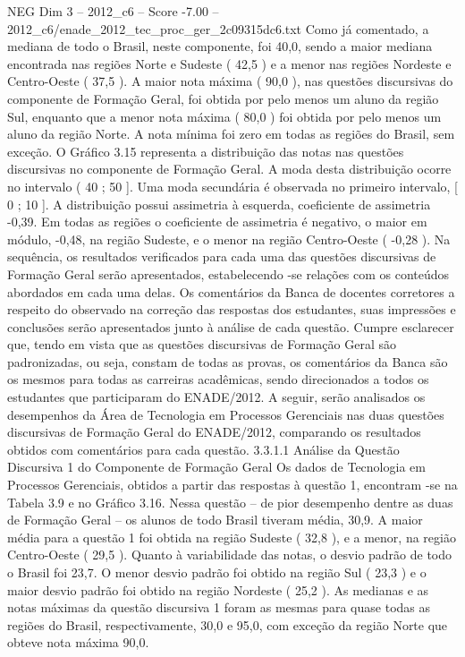 \begin{textsample}{NEG Dim 3 – 2012\_c6 – Score -7.00 – 2012\_c6/enade\_2012\_tec\_proc\_ger\_2c09315dc6.txt}
Como já comentado, a mediana de todo o Brasil, neste componente, foi 40,0, sendo a maior mediana encontrada nas regiões Norte e Sudeste ( 42,5 ) e a menor nas regiões Nordeste e Centro-Oeste ( 37,5 ).
A maior nota máxima ( 90,0 ), nas questões discursivas do componente de Formação Geral, foi obtida por pelo menos um aluno da região Sul, enquanto que a menor nota máxima ( 80,0 ) foi obtida por pelo menos um aluno da região Norte.
A nota mínima foi zero em todas as regiões do Brasil, sem exceção.
O Gráfico 3.15 representa a distribuição das notas nas questões discursivas no componente de Formação Geral.
A moda desta distribuição ocorre no intervalo ( 40 ; 50 ].
Uma moda secundária é observada no primeiro intervalo, [ 0 ; 10 ].
A distribuição possui assimetria à esquerda, coeficiente de assimetria -0,39.
Em todas as regiões o coeficiente de assimetria é negativo, o maior em módulo, -0,48, na região Sudeste, e o menor na região Centro-Oeste ( -0,28 ).
Na sequência, os resultados verificados para cada uma das questões discursivas de Formação Geral serão apresentados, estabelecendo -se relações com os conteúdos abordados em cada uma delas.
Os comentários da Banca de docentes corretores a respeito do observado na correção das respostas dos estudantes, suas impressões e conclusões serão apresentados junto à análise de cada questão.
Cumpre esclarecer que, tendo em vista que as questões discursivas de Formação Geral são padronizadas, ou seja, constam de todas as provas, os comentários da Banca são os mesmos para todas as carreiras acadêmicas, sendo direcionados a todos os estudantes que participaram do ENADE/2012.
A seguir, serão analisados os desempenhos da Área de Tecnologia em Processos Gerenciais nas duas questões discursivas de Formação Geral do ENADE/2012, comparando os resultados obtidos com comentários para cada questão. 3.3.1.1 Análise da Questão Discursiva 1 do Componente de Formação Geral Os dados de Tecnologia em Processos Gerenciais, obtidos a partir das respostas à questão 1, encontram -se na Tabela 3.9 e no Gráfico 3.16.
Nessa questão – de pior desempenho dentre as duas de Formação Geral – os alunos de todo Brasil tiveram média, 30,9.
A maior média para a questão 1 foi obtida na região Sudeste ( 32,8 ), e a menor, na região Centro-Oeste ( 29,5 ).
Quanto à variabilidade das notas, o desvio padrão de todo o Brasil foi 23,7.
O menor desvio padrão foi obtido na região Sul ( 23,3 ) e o maior desvio padrão foi obtido na região Nordeste ( 25,2 ).
As medianas e as notas máximas da questão discursiva 1 foram as mesmas para quase todas as regiões do Brasil, respectivamente, 30,0 e 95,0, com exceção da região Norte que obteve nota máxima 90,0.

\end{textsample}
